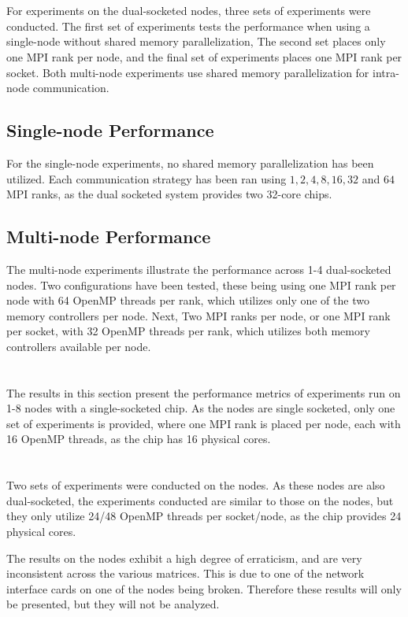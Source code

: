 

\section{}
For experiments on the dual-socketed  nodes, three sets of experiments were conducted. The first set of experiments tests the performance when using a single-node without shared memory parallelization, The second set places only one MPI rank per node, and the final set of experiments places one MPI rank per socket. Both multi-node experiments use shared memory parallelization for intra-node communication. 
\medskip

\subsection{Single-node Performance}
\label{sec:singlenode}
For the single-node experiments, no shared memory parallelization has been utilized. Each communication strategy has been ran using \(1,2,4,8,16,32\) and \(64\) MPI ranks, as the dual socketed system provides two 32-core  chips.
\medskip



\subsection{Multi-node Performance}
The multi-node experiments illustrate the performance across 1-4 dual-socketed nodes. Two configurations have been tested, these being using one MPI rank per node with 64 OpenMP threads per rank, which utilizes only one of the two memory controllers per node. Next, Two MPI ranks per node, or one MPI rank per socket, with 32 OpenMP threads per rank, which utilizes both memory controllers available per node. 
\medskip



\section{\romeq{}}
\label{sec:romemulti}
The results in this section present the performance metrics of experiments run on 1-8 nodes with a single-socketed \romeq{} chip. As the nodes are single socketed, only one set of experiments is provided, where one MPI rank is placed per node, each with 16 OpenMP threads, as the \romeq{} chip has 16 physical cores.


\section{\fpgaq{}}
Two sets of experiments were conducted on the \fpgaq{} nodes. As these nodes are also dual-socketed, the experiments conducted are similar to those on the  nodes, but they only utilize 24/48 OpenMP threads per socket/node, as the \fpgaq{} chip provides 24 physical cores.
\medskip

The results on the \fpgaq{} nodes exhibit a high degree of erraticism, and are very inconsistent across the various matrices. This is due to one of the network interface cards on one of the \fpgaq{} nodes being broken. Therefore these results will only be presented, but they will not be analyzed. 

